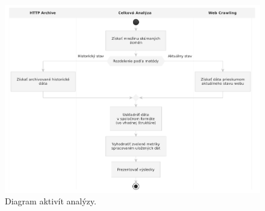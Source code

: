 \begin{figure}[!htb]
\begin{center}
 \includegraphics[scale=0.65]{obrazky-figures/analysis-activity-diagram-revised.pdf}    
 \caption{Diagram aktivít analýzy.}
 \label{img:analysis-activity-diagram}
\end{center}
\end{figure}
